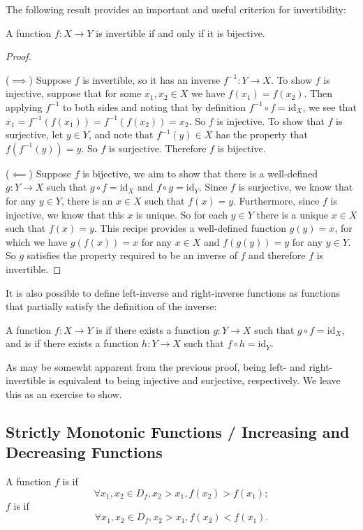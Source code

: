 The following result provides an important and useful criterion for invertibility:

\begin{theorem}
A function $f:X \to Y$ is invertible if and only if it is bijective.
\end{theorem}

\begin{proof} \

($\implies$) Suppose $f$ is invertible, so it has an inverse $f^{-1}: Y \to X$. To show $f$ is injective, suppose that for some $x_1, x_2 \in X$ we have $f(x_1) = f(x_2)$. Then applying $f^{-1}$ to both sides and noting that by definition $f^{-1} \circ f = \mathrm{id}_X$, we see that $x_1 = f^{-1}(f(x_1)) = f^{-1}(f(x_2)) = x_2$. So $f$ is injective. To show that $f$ is surjective, let $y \in Y$, and note that $f^{-1}(y) \in X$ has the property that $f(f^{-1}(y)) = y$. So $f$ is surjective. Therefore $f$ is bijective.

($\impliedby$) Suppose $f$ is bijective, we aim to show that there is a well-defined $g:Y \to X$ such that $g \circ f = \mathrm{id}_X$ and $f \circ g = \mathrm{id}_Y$. Since $f$ is surjective, we know that for any $y \in Y$, there is an $x \in X$ such that $f(x) = y$. Furthermore, since $f$ is injective, we know that this $x$ is unique. So for each $y \in Y$ there is a unique $x \in X$ such that $f(x) = y$. This recipe provides a well-defined function $g(y) = x$, for which we have $g(f(x)) = x$ for any $x \in X$ and $f(g(y)) = y$ for any $y \in Y$. So $g$ satisfies the property required to be an inverse of $f$ and therefore $f$ is invertible.
\end{proof}

It is also possible to define left-inverse and right-inverse functions as functions that partially satisfy the definition of the inverse:

\begin{definition}
A function $f:X \to Y$ is  if there exists a function $g:Y \to X$ such that $g \circ f = \mathrm{id}_X$, and is  if there exists a function $h: Y \to X$ such that $f \circ h = \mathrm{id}_Y$.
\end{definition}

As may be somewht apparent from the previous proof, being left- and right-invertible is equivalent to being injective and surjective, respectively. We leave this as an exercise to show.
\pagebreak

\subsection{Strictly Monotonic Functions / Increasing and Decreasing Functions}
\begin{definition}
A function $f$ is  if
\[\forall x_1,x_2\in D_f, x_2>x_1, f(x_2)>f(x_1); \]
$f$ is  if
\[\forall x_1,x_2\in D_f, x_2>x_1, f(x_2)<f(x_1). \]
\end{definition}

